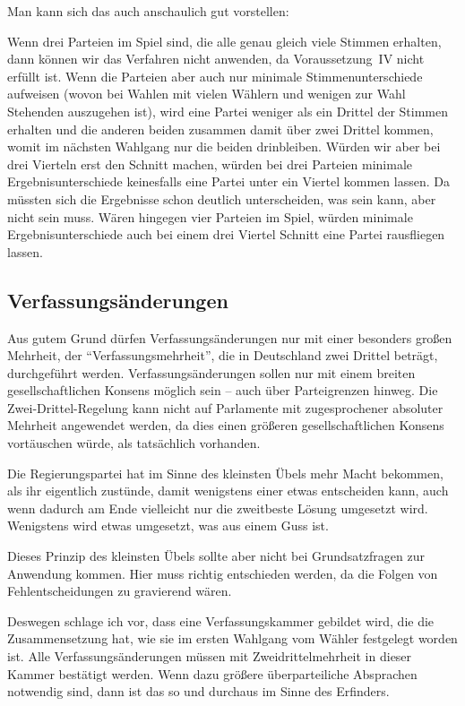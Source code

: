 Man kann sich das auch anschaulich gut vorstellen:

Wenn drei Parteien im Spiel sind, die alle genau gleich viele Stimmen erhalten, dann können wir
das Verfahren nicht anwenden, da Voraussetzung~IV nicht erfüllt ist. Wenn die Parteien aber auch
nur minimale Stimmenunterschiede aufweisen (wovon bei Wahlen mit vielen Wählern und wenigen zur
Wahl Stehenden auszugehen ist), wird eine Partei weniger als ein Drittel der Stimmen erhalten und
die anderen beiden zusammen damit über zwei Drittel kommen, womit im nächsten Wahlgang nur die
beiden drinbleiben. Würden wir aber bei drei Vierteln erst den Schnitt machen, würden bei drei
Parteien minimale Ergebnisunterschiede keinesfalls eine Partei unter ein Viertel kommen lassen.
Da müssten sich die Ergebnisse schon deutlich unterscheiden, was sein kann, aber nicht sein muss.
Wären hingegen vier Parteien im Spiel, würden minimale Ergebnisunterschiede auch bei einem drei
Viertel Schnitt eine Partei rausfliegen lassen.

\subsection{Verfassungsänderungen} \label{subsec:verfassungsaenderungen}

Aus gutem Grund dürfen Verfassungsänderungen nur mit einer besonders großen Mehrheit, der
\enquote{Verfassungsmehrheit}, die in Deutschland zwei Drittel beträgt, durchgeführt werden.
Verfassungsänderungen sollen nur mit einem breiten gesellschaftlichen Konsens möglich sein --
auch über Parteigrenzen hinweg. Die Zwei-Drittel-Regelung kann nicht auf Parlamente mit
zugesprochener absoluter Mehrheit angewendet werden, da dies einen größeren gesellschaftlichen
Konsens vortäuschen würde, als tatsächlich vorhanden.

Die Regierungspartei hat im Sinne des
kleinsten Übels mehr Macht bekommen, als ihr eigentlich zustünde, damit wenigstens einer etwas
entscheiden kann, auch wenn dadurch am Ende vielleicht nur die zweitbeste Lösung umgesetzt wird.
Wenigstens wird etwas umgesetzt, was aus einem Guss ist.

Dieses Prinzip des kleinsten Übels sollte aber nicht bei Grundsatzfragen zur Anwendung kommen.
Hier muss richtig entschieden werden, da die Folgen von Fehlentscheidungen zu gravierend wären.

Deswegen schlage ich vor, dass eine Verfassungskammer gebildet wird, die die Zusammensetzung hat,
wie sie im ersten Wahlgang vom Wähler festgelegt worden ist. Alle Verfassungsänderungen müssen
mit Zweidrittelmehrheit in dieser Kammer bestätigt werden. Wenn dazu größere überparteiliche
Absprachen notwendig sind, dann ist das so und durchaus im Sinne des Erfinders.

